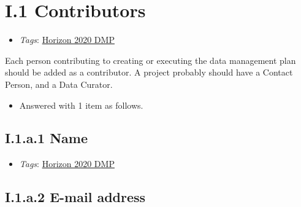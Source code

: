 \documentclass[a4paper,12pt]{report}
\begin{document}
\section*{\protect\textcolor{colorSecId}{I.1} Contributors}

\label{1e85da40-bbfc-4180-903e-6c569ed2da38.73d686bd-7939-412e-8631-502ee6d9ea7b}


\begin{itemize}
  \item \textit{Tags}: \ul{Horizon 2020 DMP}
  \end{itemize}


\noindent
\begin{markdown}
Each person contributing to creating or executing the data management plan should be added as a contributor. A project probably should have a Contact Person, and a Data Curator.
\end{markdown}


\begin{itemize}
  \item[\ArrowBoldDownRight] Answered with 1 item as follows.
\end{itemize}%
\subsection*{\protect\textcolor{colorSecId}{I.1.a.1} Name}

\label{1e85da40-bbfc-4180-903e-6c569ed2da38.73d686bd-7939-412e-8631-502ee6d9ea7b.e353afd1-f1ef-42df-a9f8-4eaac8800486.6155ad47-3d1e-4488-9f2a-742de1e56580}


\begin{itemize}
  \item \textit{Tags}: \ul{Horizon 2020 DMP}
  \end{itemize}





\subsection*{\protect\textcolor{colorSecId}{I.1.a.2} E-mail address}
\end{document}
